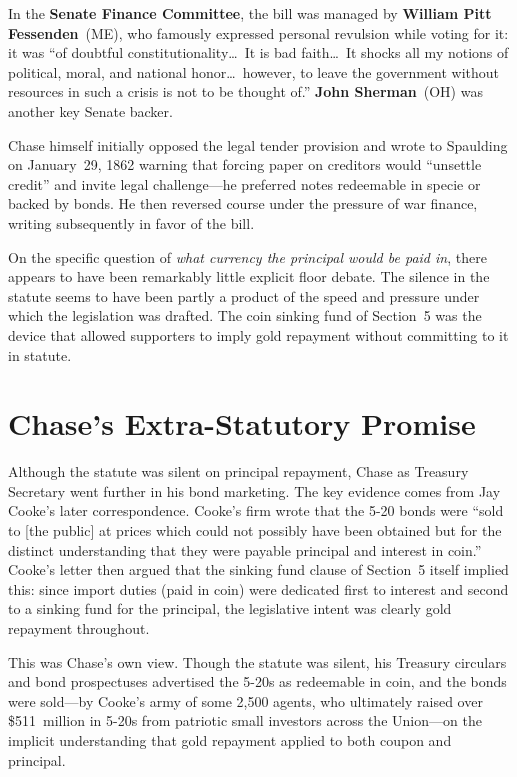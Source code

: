 \documentclass[12pt]{article}
\begin{document}
In the \textbf{Senate Finance Committee}, the bill was managed by
\textbf{William Pitt Fessenden}~(ME), who famously expressed personal
revulsion while voting for it: it was ``of doubtful
constitutionality\ldots\ It is bad faith\ldots\ It shocks all my notions
of political, moral, and national honor\ldots\ however, to leave the
government without resources in such a crisis is not to be thought of.''
\textbf{John Sherman}~(OH) was another key Senate backer.

Chase himself initially opposed the legal tender provision and wrote to
Spaulding on January~29, 1862 warning that forcing paper on creditors
would ``unsettle credit'' and invite legal challenge---he preferred notes
redeemable in specie or backed by bonds. He then reversed course under
the pressure of war finance, writing subsequently in favor of the bill.

On the specific question of \textit{what currency the principal would be
paid in}, there appears to have been remarkably little explicit floor
debate. The silence in the statute seems to have been partly a product of
the speed and pressure under which the legislation was drafted. The coin
sinking fund of Section~5 was the device that allowed supporters to imply
gold repayment without committing to it in statute.

\section{Chase's Extra-Statutory Promise}

Although the statute was silent on principal repayment, Chase as Treasury
Secretary went further in his bond marketing. The key evidence comes from
Jay Cooke's later correspondence. Cooke's firm wrote that the 5-20 bonds
were ``sold to [the public] at prices which could not possibly have been
obtained but for the distinct understanding that they were payable
principal and interest in coin.'' Cooke's letter then argued that the
sinking fund clause of Section~5 itself implied this: since import duties
(paid in coin) were dedicated first to interest and second to a sinking
fund for the principal, the legislative intent was clearly gold repayment
throughout.

This was Chase's own view. Though the statute was silent, his Treasury
circulars and bond prospectuses advertised the 5-20s as redeemable in
coin, and the bonds were sold---by Cooke's army of some 2,500 agents, who
ultimately raised over \$511~million in 5-20s from patriotic small
investors across the Union---on the implicit understanding that gold
repayment applied to both coupon and principal.
\end{document}
